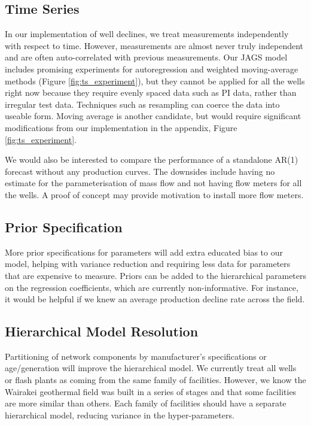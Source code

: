 \documentclass[a4paper, 12pt]{article}
\begin{document}
\subsection{Time Series}
In our implementation of well declines, we treat measurements independently with respect to time. However, measurements are almost never truly independent and are often auto-correlated with previous measurements. Our JAGS model includes promising experiments for autoregression and weighted moving-average methods (Figure \ref{fig:ts_experiment}), but they cannot be applied for all the wells right now because they require evenly spaced data such as PI data, rather than irregular test data. Techniques such as resampling can coerce the data into useable form. Moving average is another candidate, but would require significant modifications from our implementation in the appendix, Figure \ref{fig:ts_experiment}.

We would also be interested to compare the performance of a standalone AR(1) forecast without any production curves. The downsides include having no estimate for the parameterisation of mass flow and not having flow meters for all the wells. A proof of concept may provide motivation to install more flow meters.

\subsection{Prior Specification}
More prior specifications for parameters will add extra educated bias to our model, helping with variance reduction and requiring less data for parameters that are expensive to measure. Priors can be added to the hierarchical parameters on the regression coefficients, which are currently non-informative. For instance, it would be helpful if we knew an average production decline rate across the field.

\subsection{Hierarchical Model Resolution}
Partitioning of network components by manufacturer's specifications or age/generation will improve the hierarchical model. We currently treat all wells or flash plants as coming from the same family of facilities. However, we know the Wairakei geothermal field was built in a series of stages and that some facilities are more similar than others. Each family of facilities should have a separate hierarchical model, reducing variance in the hyper-parameters.
\end{document}

